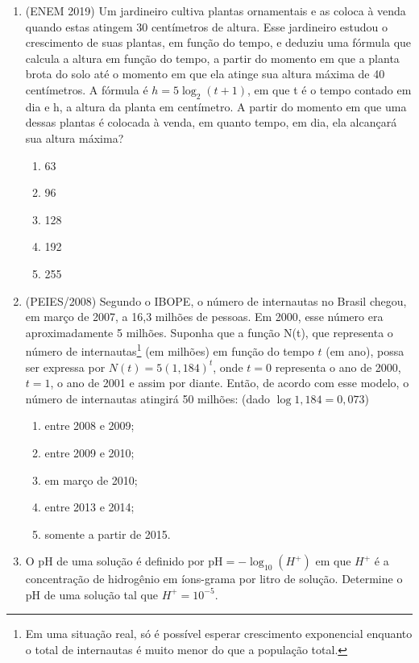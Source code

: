 \begin{enumerate}
\item \label{Exer4} (ENEM 2019) Um jardineiro cultiva plantas ornamentais e as coloca à venda quando estas atingem 30 centímetros de altura. Esse jardineiro estudou o crescimento de suas plantas, em função do tempo, e deduziu uma fórmula que calcula a altura em função do tempo, a partir do momento em que a planta brota do solo até o momento em que ela atinge sua altura máxima de 40 centímetros. A fórmula é $h = 5\log_2 (t + 1)$, em que t é o tempo contado em dia e h, a altura da planta em centímetro. A partir do momento em que uma dessas plantas é colocada à venda, em quanto tempo, em dia, ela alcançará sua altura máxima?
\begin{enumerate}
\item 63
\item 96
\item 128
\item 192
\item 255
\end{enumerate}


\item \label{Exer5} (PEIES/2008) Segundo o IBOPE, o número de internautas no Brasil chegou, em março de 2007, a 16,3 milhões de pessoas. Em 2000, esse número era aproximadamente 5 milhões. Suponha que a função N(t), que representa o número de internautas\footnote{Em uma situação real, só é possível esperar crescimento exponencial enquanto o total de internautas é muito menor do que a população total.} (em milhões) em função do tempo $t$ (em ano), possa ser expressa por $N(t) = 5(1{,}184)^t$, onde $t = 0$ representa o ano de 2000, $t = 1$, o ano de 2001 e assim por diante. Então, de acordo com esse modelo, o número de internautas atingirá 50 milhões: (dado $\log 1{,}184 = 0{,}073$)
\begin{enumerate}
\item entre 2008 e 2009;
\item entre 2009 e 2010;
\item em março de 2010;
\item entre 2013 e 2014;
\item somente a partir de 2015.
\end{enumerate}



\item \label{Exer6}

O pH de uma solução é definido por pH$=-\log_{10}(H^+)$  em que $H^+$ é a concentração de hidrogênio em íons-grama por litro de solução. Determine o pH de uma solução tal que $H^+ = 10^{-5}$.



\end{enumerate}
